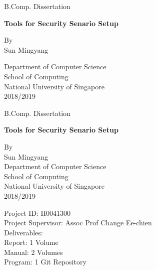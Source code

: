 \documentclass[12pt]{report}
\begin{document}
\begin{titlepage}
\begin{center}
B.Comp. Dissertation\\
\vspace{3cm}

{\large\textbf{Tools for Security Senario Setup}}

\vspace{5cm}

By\\

Sun Mingyang

\vfill

Department of Computer Science\\
School of Computing\\
National University of Singapore\\
2018/2019
\end{center}
\end{titlepage}


\begin{titlepage}
\begin{center}

B.Comp. Dissertation
\vspace{1cm}

{\large\textbf{Tools for Security Senario Setup}}


\vspace{4cm}

By\\
Sun Mingyang\\
\vspace{2cm}
Department of Computer Science\\
\vspace{0.3cm}
School of Computing\\
\vspace{0.3cm}
National University of Singapore\\
\vspace{0.3cm}
2018/2019\\
\end{center}
	
\vfill

\begin{flushleft}
Project ID: H0041300\\
Project Supervisor: Assoc Prof Change Ee-chien\\
\vspace{0.5cm}
Deliverables:\\
\setlength{\parindent}{30pt}
Report: 1 Volume\\
Manual: 2 Volumes\\
Program: 1 Git Repository\\
\end{flushleft}
\end{titlepage}
\end{document}
